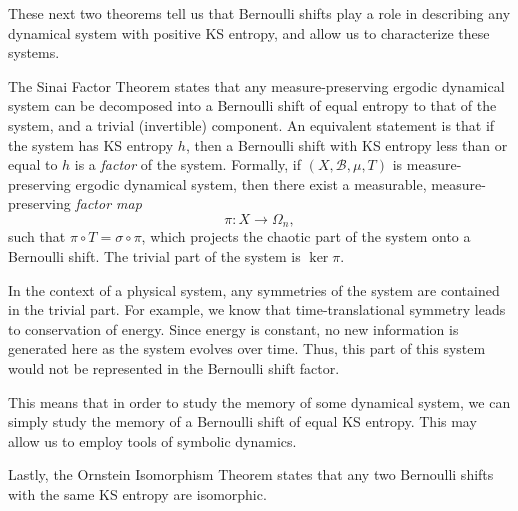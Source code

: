 \documentclass{article}
\begin{document}
These next two theorems tell us that Bernoulli shifts play a role in describing any dynamical system with positive KS entropy, and allow us to characterize these systems. 

The Sinai Factor Theorem states that any measure-preserving ergodic dynamical system can be decomposed into a Bernoulli shift of equal entropy to that of the system, and a trivial (invertible) component. An equivalent statement is that if the system has KS entropy $h$, then a Bernoulli shift with KS entropy less than or equal to $h$ is a \emph{factor} of the system. Formally, if $(X,\mathcal{B},\mu,T)$ is measure-preserving ergodic dynamical system, then there exist a measurable, measure-preserving \emph{factor map} 
\[ \pi:X\to\Omega_n, \] such that $\pi\circ T=\sigma\circ\pi$, which projects the chaotic part of the system onto a Bernoulli shift. The trivial part of the system is $\ker\pi$. 

In the context of a physical system, any symmetries of the system are contained in the trivial part. For example, we know that time-translational symmetry leads to conservation of energy. Since energy is constant, no new information is generated here as the system evolves over time. Thus, this part of this system would not be represented in the Bernoulli shift factor.

This means that in order to study the memory of some dynamical system, we can simply study the memory of a Bernoulli shift of equal KS entropy. This may allow us to employ tools of symbolic dynamics.

Lastly, the Ornstein Isomorphism Theorem states that any two Bernoulli shifts with the same KS entropy are isomorphic.
\end{document}
